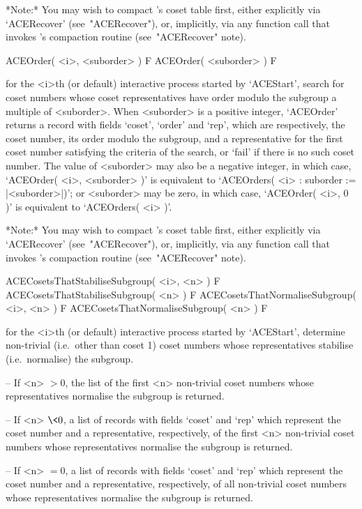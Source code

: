 *Note:*
You may wish to compact {\ACE}'s coset table first, either  explicitly
via `ACERecover' (see~"ACERecover"), or, implicitly, via any  function
call that invokes {\ACE}'s compaction routine (see~"ACERecover" note).

\>ACEOrder( <i>, <suborder> ) F
\>ACEOrder( <suborder> ) F

for the <i>th (or  default)  interactive  {\ACE}  process  started  by
`ACEStart', search for coset numbers whose coset representatives  have
order modulo the subgroup a multiple of <suborder>. When <suborder> is
a positive integer, `ACEOrder' returns a record with  fields  `coset',
`order' and `rep', which are respectively, the coset number, its order
modulo the subgroup, and a representative for the first  coset  number
satisfying the criteria of the search, or `fail' if there is  no  such
coset number. The value of <suborder> may also be a negative  integer,
in  which  case,  `ACEOrder(  <i>,  <suborder>  )'  is  equivalent  to
`ACEOrders( <i> : suborder := |<suborder>|)';  or  <suborder>  may  be
zero, in which case, `ACEOrder( <i>, 0 )' is equivalent to `ACEOrders(
<i> )'.

*Note:*
You may wish to compact {\ACE}'s coset table first, either  explicitly
via `ACERecover' (see~"ACERecover"), or, implicitly, via any  function
call that invokes {\ACE}'s compaction routine (see~"ACERecover" note).

\>ACECosetsThatStabiliseSubgroup( <i>, <n> ) F
\>ACECosetsThatStabiliseSubgroup( <n> ) F
\>ACECosetsThatNormaliseSubgroup( <i>, <n> ) F
\>ACECosetsThatNormaliseSubgroup( <n> ) F

for the <i>th (or  default)  interactive  {\ACE}  process  started  by
`ACEStart', determine non-trivial  (i.e.~other  than  coset  1)  coset
numbers whose representatives stabilise (i.e.~normalise) the subgroup.

\beginlist

\item{--} If <n> $> 0$, the list of the first  <n>  non-trivial  coset
numbers whose representatives normalise the subgroup is returned.

\item{--} If <n> $\< 0$, a list of records  with  fields  `coset'  and
`rep'  which  represent  the  coset  number  and   a   representative,
respectively,  of  the  first  <n>  non-trivial  coset  numbers  whose
representatives normalise the subgroup is returned.

\item{--} If <n> $= 0$, a list of  records  with  fields  `coset'  and
`rep'  which  represent  the  coset  number  and   a   representative,
respectively, of all non-trivial coset numbers  whose  representatives
normalise the subgroup is returned.

